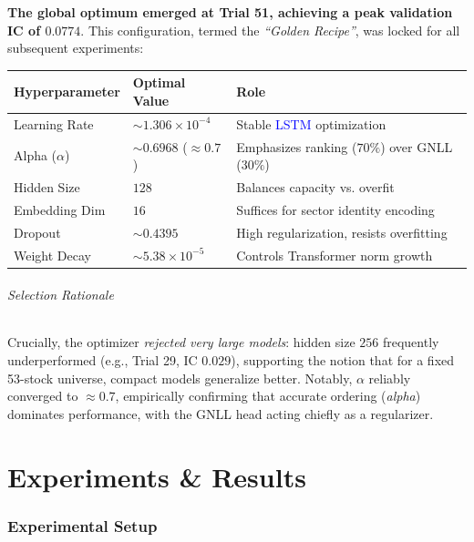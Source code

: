 \documentclass[twoside,final]{hcmut-report}
\begin{document}
\textbf{The global optimum emerged at Trial 51, achieving a peak validation IC of $0.0774$}. This configuration, termed the \textit{``Golden Recipe''}, was locked for all subsequent experiments:

\begin{center}
  \renewcommand{\arraystretch}{1.1}
  \begin{tabular}{lll}
    \toprule
    \textbf{Hyperparameter} & \textbf{Optimal Value}      & \textbf{Role}                                  \\
    \midrule
    Learning Rate           & $\sim1.306 \times 10^{-4}$  & Stable \textcolor{blue}{LSTM} optimization     \\
    Alpha ($\alpha$)        & $\sim0.6968$ ($\approx0.7$) & Emphasizes ranking ($70\%$) over GNLL ($30\%$) \\
    Hidden Size             & $128$                       & Balances capacity vs. overfit                  \\
    Embedding Dim           & $16$                        & Suffices for sector identity encoding          \\
    Dropout                 & $\sim0.4395$                & High regularization, resists overfitting       \\
    Weight Decay            & $\sim5.38 \times 10^{-5}$   & Controls Transformer norm growth               \\
    \bottomrule
  \end{tabular}
  \label{tab:hyperparameter_value}
\end{center}

\paragraph{Selection Rationale}
Crucially, the optimizer \textit{rejected very large models}: hidden size $256$ frequently underperformed (e.g., Trial 29, IC $0.029$), supporting the notion that for a fixed 53-stock universe, compact models generalize better. Notably, $\alpha$ reliably converged to $\approx0.7$, empirically confirming that accurate ordering (\textit{alpha}) dominates performance, with the GNLL head acting chiefly as a regularizer.

\part{Experiments \& Results}
\section{Experimental Setup}
\end{document}
